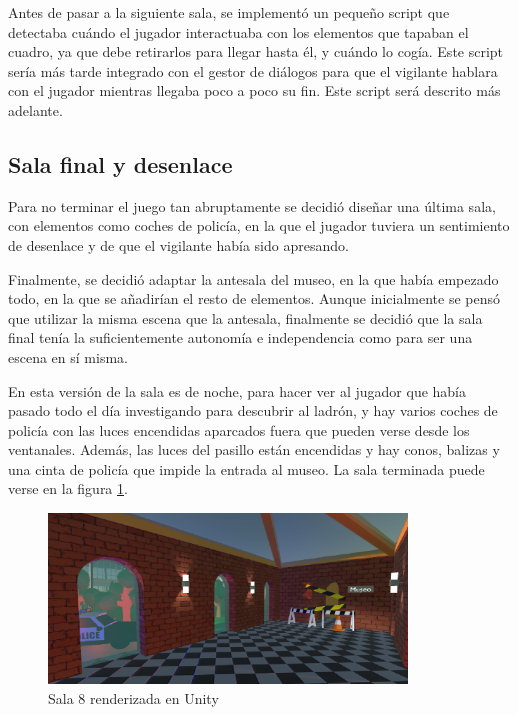 Antes de pasar a la siguiente sala, se implementó un pequeño script que detectaba cuándo el jugador interactuaba con los elementos que tapaban el cuadro, ya que debe retirarlos para llegar hasta él, y cuándo lo cogía. Este script sería más tarde integrado con el gestor de diálogos para que el vigilante hablara con el jugador mientras llegaba poco a poco su fin. Este script será descrito más adelante.

\subsection{Sala final y desenlace}

Para no terminar el juego tan abruptamente se decidió diseñar una última sala, con elementos como coches de policía, en la que el jugador tuviera un sentimiento de desenlace y de que el vigilante había sido apresando.

Finalmente, se decidió adaptar la antesala del museo, en la que había empezado todo, en la que se añadirían el resto de elementos. Aunque inicialmente se pensó que utilizar la misma escena que la antesala, finalmente se decidió que la sala final tenía la suficientemente autonomía e independencia como para ser una escena en sí misma.

En esta versión de la sala es de noche, para hacer ver al jugador que había pasado todo el día investigando para descubrir al ladrón, y hay varios coches de policía con las luces encendidas aparcados fuera que pueden verse desde los ventanales. Además, las luces del pasillo están encendidas y hay conos, balizas y una cinta de policía que impide la entrada al museo. La sala terminada puede verse en la figura \ref{fig:unity-sala-8}.

\begin{figure}[!h]
\begin{center}
\includegraphics[width=0.85\textwidth]{imagenes/7/salas-unity/unity-sala-8.png}
\caption{Sala 8 renderizada en Unity}
\label{fig:unity-sala-8}
\end{center}
\end{figure}

